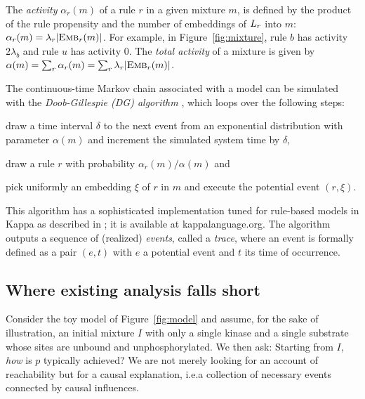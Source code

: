 The \emph{activity} $\alpha_r(m)$ of a rule $r$ in a given mixture $m$,
is defined by the product of the rule propensity and the number of
embeddings of $L_{r}$ into $m$:
$\alpha_r(m)=\lambda_r|{\textsc{Emb}}_{r}(m)|$. For example, in
Figure~\ref{fig:mixture}, rule $b$ has activity $2\lambda_b$ and rule
$u$ has activity $0$. The \emph{total activity} of a mixture is given
by $\alpha(m)=\sum_r\alpha_r(m)=\sum_r\lambda_r|{\textsc{Emb}}_{r}(m)|$.

The continuous-time Markov chain associated with a model can be
simulated with the \emph{Doob-Gillespie (DG) algorithm}
\cite{gillespie1977exact}, which loops over the
following steps:
\begin{inparaenum}[(1)]
\item draw a time interval $\delta$ to the next event from an
  exponential distribution with parameter $\alpha(m)$ and increment
  the simulated system time by $\delta$,
\item draw a rule $r$ with probability $\alpha_r(m)/\alpha(m)$ and
\item pick uniformly an embedding $\xi$ of $r$ in $m$ and execute the
  potential event $(r, \xi)$.
\end{inparaenum}
This algorithm has a sophisticated implementation tuned for rule-based
models in Kappa as described in
\cite{DanosEtAl-APLAS07,BoutillierEK17}; it is available at
kappalanguage.org. The algorithm outputs a sequence of (realized)
\emph{events}, called a \emph{trace}, where an event is formally
defined as a pair $(e, t)$ with $e$ a potential event and $t$ its time
of occurrence.



\subsection{Where existing analysis falls short}
\label{subsec:dumb-story}


Consider the toy model of Figure~\ref{fig:model} and assume, for the
sake of illustration, an initial mixture $I$ with only a single kinase
and a single substrate whose sites are unbound and
unphosphorylated. We then ask: Starting from $I$, \emph{how} is $p$
typically achieved? We are not merely looking for an account of
reachability but for a causal explanation, i.e.\@ a collection of
necessary events connected by causal influences.

